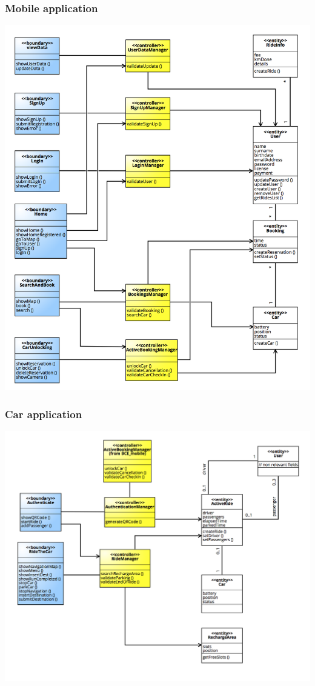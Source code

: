 \documentclass[]{article}
\begin{document}
\subsubsection{Mobile application}\label{mobile-application-2}

\centerline{\includegraphics{./images/BCE_Mobile.png}}

\subsubsection{Car application}\label{car-application-1}

\centerline{\includegraphics{./images/BCE_Car.png}}
\end{document}
